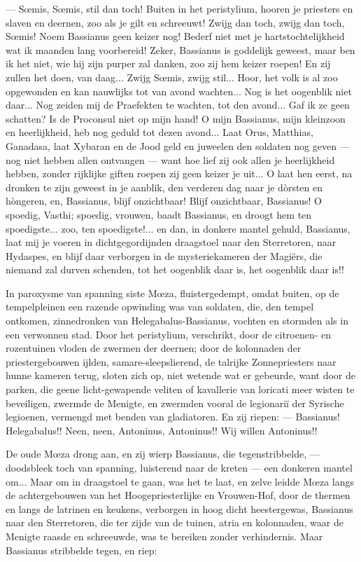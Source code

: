 \documentclass[a4paper, 12pt, oneside, dutch]{article}
\begin{document}
--- Sœmis, Sœmis, stil dan toch! Buiten in het peristylium, hooren je priesters en slaven en deernen, zoo als je gilt en schreeuwt! Zwijg dan toch, zwijg dan toch, Sœmis! Noem Bassianus geen keizer nog! Bederf niet met je hartstochtelijkheid wat ik maanden lang voorbereid! Zeker, Bassianus is goddelijk geweest, maar ben ik het niet, wie hij zijn purper zal danken, zoo zij hem keizer roepen! En zij zullen het doen, van daag... Zwijg Sœmis, zwijg stil... Hoor, het volk is al zoo opgewonden en kan nauwlijks tot van avond wachten... Nog is het oogenblik niet daar... Nog zeiden mij de Praefekten te wachten, tot den avond... Gaf ik ze geen schatten? Is de Proconsul niet op mijn hand! O mijn Bassianus, mijn kleinzoon en heerlijkheid, heb nog geduld tot dezen avond... Laat Orus, Matthias, Ganadasa, laat Xybaran en de Jood geld en juweelen den soldaten nog geven --- nog niet hebben allen ontvangen --- want hoe lief zij ook allen je heerlijkheid hebben, zonder rijklijke giften roepen zij geen keizer je uit... O laat hen eerst, na dronken te zijn geweest in je aanblik, den verderen dag naar je dòrsten en hòngeren, en, Bassianus, blijf onzichtbaar! Blijf onzichtbaar, Bassianus! O spoedig, Vasthi; spoedig, vrouwen, baadt Bassianus, en droogt hem ten spoedigste... zoo, ten spoedigste!... en dan, in donkere mantel gehuld, Bassianus, laat mij je voeren in dichtgegordijnden draagstoel naar den Sterretoren, naar Hydaspes, en blijf daar verborgen in de mysteriekameren der Magiërs, die niemand zal durven schenden, tot het oogenblik daar is, het oogenblik daar is!!

In paroxysme van spanning siste Mœza, fluistergedempt, omdat buiten, op de tempelpleinen een razende opwinding was van soldaten, die, den tempel ontkomen, zinnedronken van Helegabalus-Bassianus, vochten en stormden als in een verwonnen stad. Door het peristylium, verschrikt, door de citroenen- en rozentuinen vloden de zwermen der deernen; door de kolonnaden der priestergebouwen ijlden, samare-sleepslierend, de talrijke Zonnepriesters naar hunne kameren terug, sloten zich op, niet wetende wat er gebeurde, want door de parken, die geene licht-gewapende veliten of kavallerie van loricati meer wisten te beveiligen, zwermde de Menigte, en zwermden vooral de legionariï der Syrische legioenen, vermengd met benden van gladiatoren. En zij riepen: --- Bassianus! Helegabalus!! Neen, neen, Antoninus, Antoninus!! Wij willen Antoninus!!

De oude Mœza drong aan, en zij wierp Bassianus, die tegenstribbelde, --- doodsbleek toch van spanning, luisterend naar de kreten --- een donkeren mantel om... Maar om in draagstoel te gaan, was het te laat, en zelve leidde Mœza langs de achtergebouwen van het Hoogepriesterlijke en Vrouwen-Hof, door de thermen en langs de latrinen en keukens, verborgen in hoog dicht heestergewas, Bassianus naar den Sterretoren, die ter zijde van de tuinen, atria en kolonnaden, waar de Menigte raasde en schreeuwde, was te bereiken zonder verhindernis. Maar Bassianus stribbelde tegen, en riep:
\end{document}
